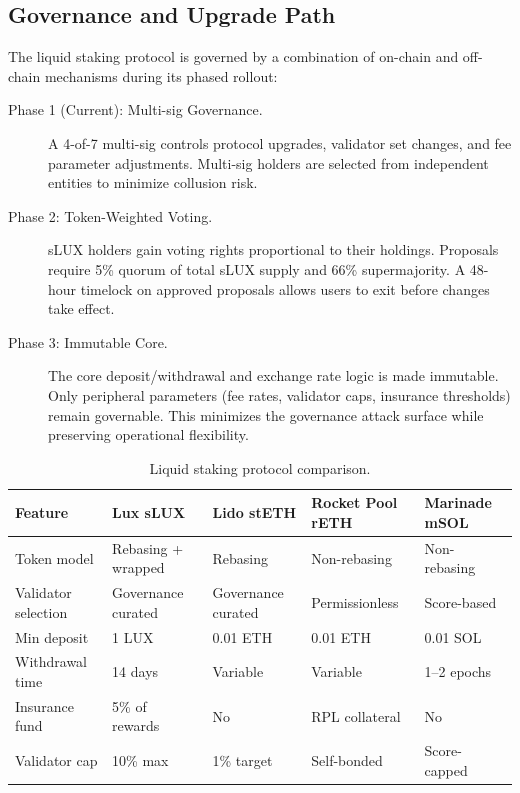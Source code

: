 \documentclass[11pt,a4paper]{article}
\begin{document}
\subsection{Governance and Upgrade Path}

The liquid staking protocol is governed by a combination of on-chain and off-chain mechanisms during its phased rollout:

\begin{description}
    \item[Phase 1 (Current): Multi-sig Governance.] A 4-of-7 multi-sig controls protocol upgrades, validator set changes, and fee parameter adjustments. Multi-sig holders are selected from independent entities to minimize collusion risk.

    \item[Phase 2: Token-Weighted Voting.] sLUX holders gain voting rights proportional to their holdings. Proposals require 5\% quorum of total sLUX supply and 66\% supermajority. A 48-hour timelock on approved proposals allows users to exit before changes take effect.

    \item[Phase 3: Immutable Core.] The core deposit/withdrawal and exchange rate logic is made immutable. Only peripheral parameters (fee rates, validator caps, insurance thresholds) remain governable. This minimizes the governance attack surface while preserving operational flexibility.
\end{description}

\begin{table}[H]
\centering
\caption{Liquid staking protocol comparison.}
\label{tab:lstcompare}
\begin{tabular}{p{2.5cm}p{2.3cm}p{2.3cm}p{2.3cm}p{2.3cm}}
\toprule
\textbf{Feature} & \textbf{Lux sLUX} & \textbf{Lido stETH} & \textbf{Rocket Pool rETH} & \textbf{Marinade mSOL} \\
\midrule
Token model & Rebasing + wrapped & Rebasing & Non-rebasing & Non-rebasing \\
Validator selection & Governance curated & Governance curated & Permissionless & Score-based \\
Min deposit & 1 LUX & 0.01 ETH & 0.01 ETH & 0.01 SOL \\
Withdrawal time & 14 days & Variable & Variable & 1--2 epochs \\
Insurance fund & 5\% of rewards & No & RPL collateral & No \\
Validator cap & 10\% max & 1\% target & Self-bonded & Score-capped \\
\bottomrule
\end{tabular}
\end{table}
\end{document}
